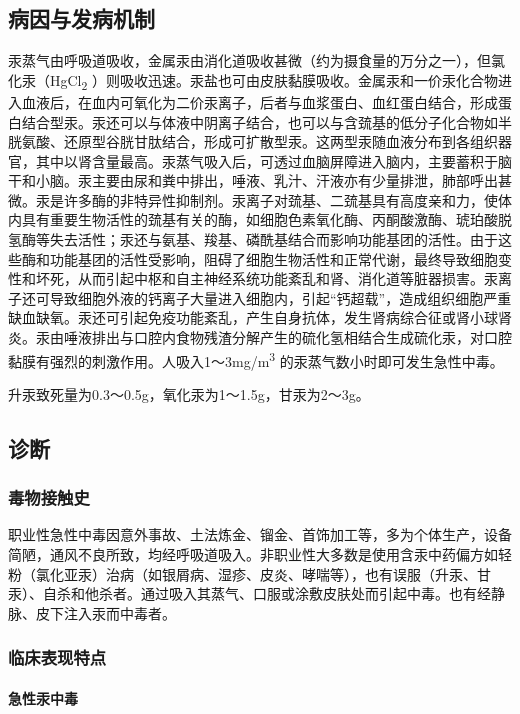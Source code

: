 \subsection{病因与发病机制}

汞蒸气由呼吸道吸收，金属汞由消化道吸收甚微（约为摄食量的万分之一），但氯化汞（HgCl\textsubscript{2}
）则吸收迅速。汞盐也可由皮肤黏膜吸收。金属汞和一价汞化合物进入血液后，在血内可氧化为二价汞离子，后者与血浆蛋白、血红蛋白结合，形成蛋白结合型汞。汞还可以与体液中阴离子结合，也可以与含巯基的低分子化合物如半胱氨酸、还原型谷胱甘肽结合，形成可扩散型汞。这两型汞随血液分布到各组织器官，其中以肾含量最高。汞蒸气吸入后，可透过血脑屏障进入脑内，主要蓄积于脑干和小脑。汞主要由尿和粪中排出，唾液、乳汁、汗液亦有少量排泄，肺部呼出甚微。汞是许多酶的非特异性抑制剂。汞离子对巯基、二巯基具有高度亲和力，使体内具有重要生物活性的巯基有关的酶，如细胞色素氧化酶、丙酮酸激酶、琥珀酸脱氢酶等失去活性；汞还与氨基、羧基、磷酰基结合而影响功能基团的活性。由于这些酶和功能基团的活性受影响，阻碍了细胞生物活性和正常代谢，最终导致细胞变性和坏死，从而引起中枢和自主神经系统功能紊乱和肾、消化道等脏器损害。汞离子还可导致细胞外液的钙离子大量进入细胞内，引起“钙超载”，造成组织细胞严重缺血缺氧。汞还可引起免疫功能紊乱，产生自身抗体，发生肾病综合征或肾小球肾炎。汞由唾液排出与口腔内食物残渣分解产生的硫化氢相结合生成硫化汞，对口腔黏膜有强烈的刺激作用。人吸入1～3mg/m\textsuperscript{3}
的汞蒸气数小时即可发生急性中毒。

升汞致死量为0.3～0.5g，氧化汞为1～1.5g，甘汞为2～3g。

\subsection{诊断}

\subsubsection{毒物接触史}

职业性急性中毒因意外事故、土法炼金、镏金、首饰加工等，多为个体生产，设备简陋，通风不良所致，均经呼吸道吸入。非职业性大多数是使用含汞中药偏方如轻粉（氯化亚汞）治病（如银屑病、湿疹、皮炎、哮喘等），也有误服（升汞、甘汞）、自杀和他杀者。通过吸入其蒸气、口服或涂敷皮肤处而引起中毒。也有经静脉、皮下注入汞而中毒者。

\subsubsection{临床表现特点}

\paragraph{急性汞中毒}

